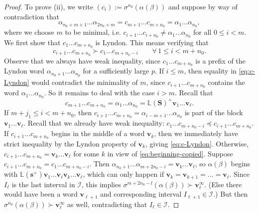 \documentclass[11pt]{amsart}
\theoremstyle{definition}
\theoremstyle{remark}
\numberwithin{equation}{section}
\renewcommand{\L}{\ensuremath{\mathbb{L}}}
\newcommand{\II}{\mathcal{I}}
\newcommand{\s}{ {\mathbf{s}}}
\newcommand{\cs}{ {\mathbf{S}}}
\renewcommand{\v}{\mathbf{v}}
\newcommand{\f}{\infty}
\newcommand{\al}{\alpha}
\newcommand{\lle}{\preccurlyeq}
\newcommand{\si}{\sigma}
\begin{document}
{\begin{proof}
To prove (ii), we write $(c_i):=\si^{n_0}(\al(\beta))$ and suppose by way of contradiction that 
\begin{equation} \label{eq:reoccurrence}
\al_{n_0+m+1}\dots\al_{2n_0+m}=c_{m+1}\dots c_{m+n_0}=\al_1\dots\al_{n_0}, 
\end{equation}
where we choose $m$ to be minimal, i.e. $c_{i+1}\dots c_{i+n_0}\neq \al_1\dots\al_{n_0}$ for all $0\leq i<m$. We first show that $c_1\dots c_{m+n_0}$ is Lyndon. This means verifying that
\begin{equation} \label{eq:c-Lyndon}
c_{i+1}\dots c_{m+n_0}\succ c_1\dots c_{m+n_0-i} \qquad \forall\,1\leq i<m+n_0.
\end{equation}
Observe that we always have weak inequality, since $c_1\dots c_{m+n_0}$ is a prefix of the Lyndon word $\al_{n_0+1}\dots\al_{n_p}$ for a sufficiently large $p$. If $i\leq m$, then equality in \eqref{eq:c-Lyndon} would contradict the minimality of $m$, since $c_{i+1}\dots c_{m+n_0}$ contains the word $\al_1\dots\al_{n_0}$. So it remains to deal with the case $i>m$.
Recall that
\begin{equation} \label{eq:beginning-copied}
c_{m+1}\dots c_{m+n_0}=\al_1\dots\al_{n_0}=\L(\cs)^+\v_1\dots\v_{\ell}.
\end{equation}
If $m+j_1\leq i<m+n_0$, then $c_{i+1}\dots c_{m+n_0}=\al_{i-m+1}\dots\al_{n_0}$ is part of the block $\v_1\dots\v_{\ell}$. 
Recall that we already have weak inequality: $c_1\dots c_{m+n_0-i}\lle c_{i+1}\dots c_{m+n_0}$. If $c_{i+1}\dots c_{m+n_0}$ begins in the middle of a word $\v_k$, then we immediately have strict inequality by the Lyndon property of $\v_k$, giving \eqref{eq:c-Lyndon}. Otherwise, $c_{i+1}\dots c_{m+n_0}=\v_k\dots\v_{\ell}$ for some $k$ in view of \eqref{eq:beginning-copied}. Suppose $c_{i+1}\dots c_{m+n_0}=c_1\dots c_{m+n_0-i}$. Then $\al_{n_0+1}\dots\al_{m+2n_0-i}=\v_k\dots\v_{\ell}$, so $\al(\beta)$ begins with $\L(\s^+)\v_1\dots \v_{\ell}\v_k\dots\v_{\ell}$, which can only happen if $\v_k=\v_{k+1}=\dots=\v_{\ell}$. Since $I_{\ell}$ is the last interval in $\mathcal{I}$, this implies $\si^{m+2n_0-l}(\al(\beta))\succ \v_{\ell}^\f$. (Else there would have been a word $\v_{\ell+1}$ and corresponding interval $I_{\ell+1}\in\II$.) But then $\si^{n_0}(\al(\beta))\succ \v_{\ell}^\f$ as well, contradicting that $I_{\ell}\in\mathcal{I}$.


\end{proof}}
\end{document}
